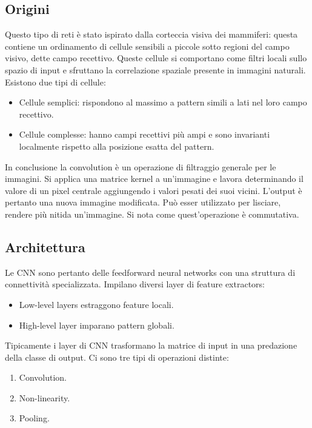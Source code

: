 	\subsection{Origini}
	Questo tipo di reti \`e stato ispirato dalla corteccia visiva dei mammiferi: questa contiene un ordinamento di cellule sensibili a piccole sotto regioni del campo visivo, dette campo recettivo.
	Queste cellule si comportano come filtri locali sullo spazio di input e sfruttano la correlazione spaziale presente in immagini naturali.
	Esistono due tipi di cellule:
	\begin{multicols}{2}
		\begin{itemize}
			\item Cellule semplici: rispondono al massimo a pattern simili a lati nel loro campo recettivo.
			\item Cellule complesse: hanno campi recettivi pi\`u ampi e sono invarianti localmente rispetto alla posizione esatta del pattern.
		\end{itemize}
	\end{multicols}
	In conclusione la convolution \`e un operazione di filtraggio generale per le immagini.
	Si applica una matrice kernel a un'immagine e lavora determinando il valore di un pixel centrale aggiungendo i valori pesati dei suoi vicini.
	L'output \`e pertanto una nuova immagine modificata.
	Pu\`o esser utilizzato per lisciare, rendere pi\`u nitida un'immagine.
	Si nota come quest'operazione \`e commutativa.

	\subsection{Architettura}
	Le CNN sono pertanto delle feedforward neural networks con una struttura di connettivit\`a specializzata.
	Impilano diversi layer di feature extractors:
	\begin{multicols}{2}
		\begin{itemize}
			\item Low-level layers estraggono feature locali.
			\item High-level layer imparano pattern globali.
		\end{itemize}
	\end{multicols}
	Tipicamente i layer di CNN trasformano la matrice di input in una predazione della classe di output.
	Ci sono tre tipi di operazioni distinte:
	\begin{multicols}{3}
		\begin{enumerate}
			\item Convolution.
			\item Non-linearity.
			\item Pooling.
		\end{enumerate}
	\end{multicols}

